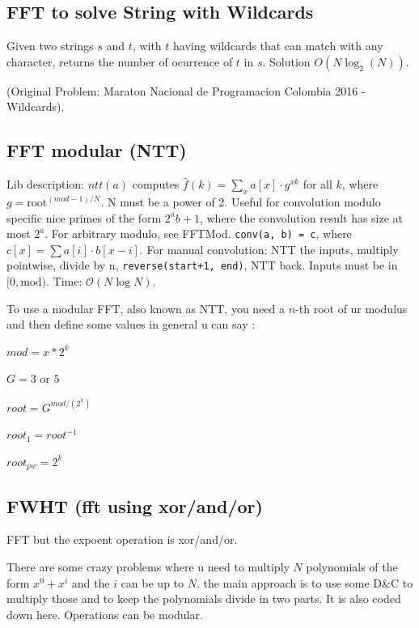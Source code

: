     \subsection{FFT to solve String with Wildcards}
    Given two strings $s$ and $t$, with $t$ having wildcards that can match with any character, returns the number of ocurrence of $t$ in $s$.
    Solution $O(N\log_2(N))$.
    
    \bigskip
    
    (Original Problem: Maraton Nacional de Programacion Colombia 2016 - Wildcards).
    
    \subsection{FFT modular (NTT)}

    Lib description: $ntt(a)$ computes $\hat f(k) = \sum_x a[x] \cdot g^{xk}$ for all $k$, where $g=\text{root}^{(mod-1)/N}$. N must be a power of 2. Useful for convolution modulo specific nice primes of the form $2^a b+1$, where the convolution result has size at most $2^a$. For arbitrary modulo, see FFTMod. \texttt{conv(a, b) = c}, where $c[x] = \sum a[i] \cdot b[x-i]$. For manual convolution: NTT the inputs, multiply pointwise, divide by n, \texttt{reverse(start+1, end)}, NTT back. Inputs must be in $[0, \text{mod})$. Time: $\mathcal{O}(N \log N)$.
    
    To use a modular FFT, also known as NTT, you need a $n$-th root of ur modulus and then define some values in general u can say :
    
    $mod = x*2^k$
    
    $G = 3 $ or $5$
    
    $root = G^{mod/(2^k)}$
    
    $root_1 = root^{-1}$
    
    $root_{pw} = 2^k$

    \subsection{FWHT (fft using xor/and/or)}
    FFT but the expoent operation is xor/and/or.

    There are some crazy problems where u need to multiply $N$ polynomials of the form $x^0 + x^i$ and the $i$ can be up to $N$. the main approach is to use some D\&C to multiply those and to keep the polynomials divide in two parts. It is also coded down here. Operations can be modular.
